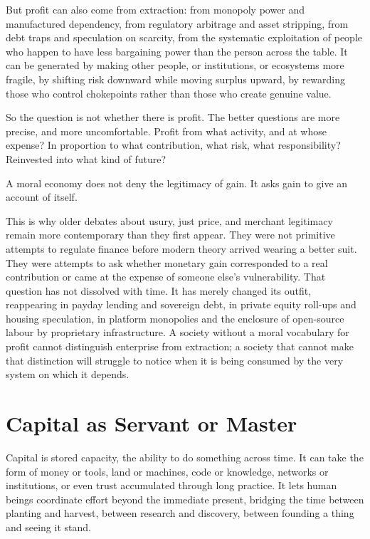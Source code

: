 \documentclass[11pt,a4paper,oneside]{book}
\begin{document}
But profit can also come from extraction: from monopoly power and manufactured dependency, from regulatory arbitrage and asset stripping, from debt traps and speculation on scarcity, from the systematic exploitation of people who happen to have less bargaining power than the person across the table. It can be generated by making other people, or institutions, or ecosystems more fragile, by shifting risk downward while moving surplus upward, by rewarding those who control chokepoints rather than those who create genuine value.

So the question is not whether there is profit. The better questions are more precise, and more uncomfortable. Profit from what activity, and at whose expense? In proportion to what contribution, what risk, what responsibility? Reinvested into what kind of future?

A moral economy does not deny the legitimacy of gain. It asks gain to give an account of itself.

This is why older debates about usury, just price, and merchant legitimacy remain more contemporary than they first appear. They were not primitive attempts to regulate finance before modern theory arrived wearing a better suit. They were attempts to ask whether monetary gain corresponded to a real contribution or came at the expense of someone else's vulnerability. That question has not dissolved with time. It has merely changed its outfit, reappearing in payday lending and sovereign debt, in private equity roll-ups and housing speculation, in platform monopolies and the enclosure of open-source labour by proprietary infrastructure. A society without a moral vocabulary for profit cannot distinguish enterprise from extraction; a society that cannot make that distinction will struggle to notice when it is being consumed by the very system on which it depends.

\section*{Capital as Servant or Master}

Capital is stored capacity, the ability to do something across time. It can take the form of money or tools, land or machines, code or knowledge, networks or institutions, or even trust accumulated through long practice. It lets human beings coordinate effort beyond the immediate present, bridging the time between planting and harvest, between research and discovery, between founding a thing and seeing it stand.
\end{document}
